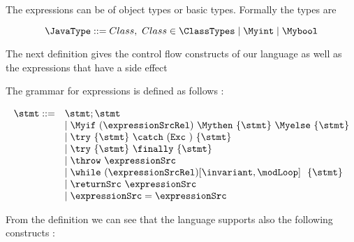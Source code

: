 The expressions can be of object types or basic types. Formally the types are 

$$
\JavaType ::= Class, \ Class \in \ClassTypes \mid \Myint \mid \Mybool
$$ 


The next definition gives the control flow constructs of our language as well as the expressions that have a side 
effect  
\begin{Statement}[Statement]
    The grammar for expressions  is defined as follows :
\end{Statement}
    $$ \begin{array} {ll}    \stmt ::=  
                                & \stmt;\stmt \\
                                & \mid \Myif \ (\expressionSrcRel) \ \Mythen \ \{ \stmt \} \  \Myelse \ \{ \stmt \}  \\
			        & \mid \try  \ \{ \stmt \}  \ \catch \ ( \mbox{\rm\texttt{Exc} } )\ \{ \stmt \} \\
		                & \mid \try  \ \{ \stmt \} \ \finally \ \{ \stmt \} \\
				& \mid \throw \ \expressionSrc  \\
                                & \mid \while \ (\expressionSrcRel) \lbrack \invariant, \modLoop \rbrack \ \do \ \{ \stmt \}\ \\
				& \mid \returnSrc \  \expressionSrc \\
                   		& \mid \expressionSrc = \expressionSrc \\
			
			
			 \end{array} 
    $$



From the definition we can see that the language supports also the following constructs :


